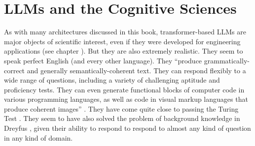 
\section{LLMs and the Cognitive Sciences}\label{llm_cogsci}


As with many architectures discussed in this book, transformer-based LLMs are major objects of scientific interest, even if they were developed for engineering applications (see chapter ). But they are also extremely realistic. They seem to speak perfect English (and every other language). They ``produce grammatically-correct and generally semantically-coherent text. They can respond flexibly to a wide range of questions, including a variety of challenging aptitude and proficiency tests. They can even generate functional blocks of computer code in various programming languages, as well as code in visual markup languages that produce coherent images'' \cite{milliere2024philosophical}. They have come quite close to passing the Turing Test \cite{jones2024does}. They seem to have also solved the problem of background knowledge in Dreyfus \cite{dreyfus1992computers}, given their ability to respond to respond to almost any kind of question in any kind of domain. 

